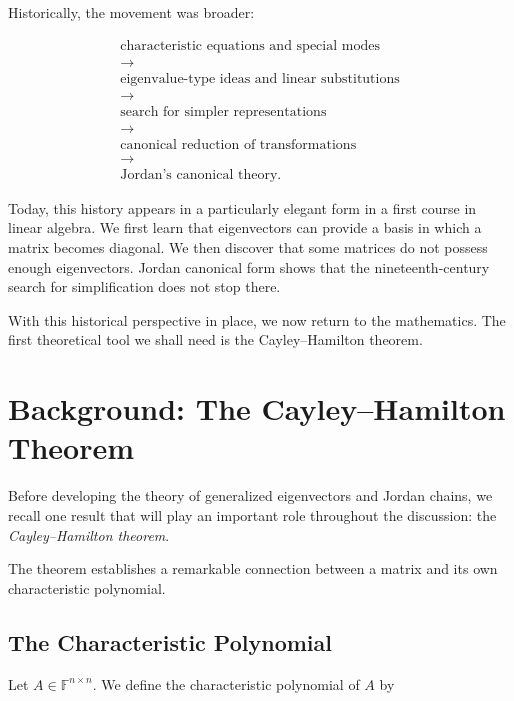 \documentclass[11pt]{article}
\begin{document}
Historically, the movement was broader:

\[
\boxed{
\begin{gathered}
\text{characteristic equations and special modes}\\
\longrightarrow\\
\text{eigenvalue-type ideas and linear substitutions}\\
\longrightarrow\\
\text{search for simpler representations}\\
\longrightarrow\\
\text{canonical reduction of transformations}\\
\longrightarrow\\
\text{Jordan's canonical theory}.
\end{gathered}
}
\]

Today, this history appears in a particularly elegant form in a first
course in linear algebra.  We first learn that eigenvectors can provide
a basis in which a matrix becomes diagonal.  We then discover that some
matrices do not possess enough eigenvectors.  Jordan canonical form
shows that the nineteenth-century search for simplification does not
stop there.

With this historical perspective in place, we now return to the
mathematics.  The first theoretical tool we shall need is the
Cayley--Hamilton theorem.


\section{Background: The Cayley--Hamilton Theorem}

Before developing the theory of generalized eigenvectors and Jordan
chains, we recall one result that will play an important role throughout
the discussion: the \emph{Cayley--Hamilton theorem}.

The theorem establishes a remarkable connection between a matrix and
its own characteristic polynomial.

\subsection{The Characteristic Polynomial}

Let \(A\in\mathbb{F}^{n\times n}\).  We define the characteristic
polynomial of \(A\) by
\end{document}
